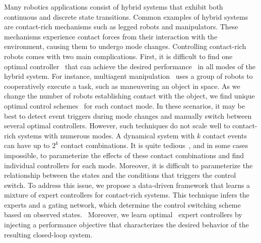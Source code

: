 

Many robotics applications consist of hybrid systems that exhibit both
continuous and discrete state transitions. Common examples of hybrid systems are
contact-rich mechanisms such as legged robots and manipulators. These mechanisms
experience contact forces from their interaction with the environment, causing
them to undergo mode changes. Controlling contact-rich robots comes with two
main complications. First, it is difficult to find one optimal
controller~ that
can achieve the desired performance~ in all modes of the hybrid system.
%
For instance, multiagent manipulation~\cite{ashenafi2021nonholonomic} uses a
group of robots to cooperatively execute a task, such as maneuvering an object in
space.
%
As we change the number of robots establishing contact with the object, we find
unique optimal control schemes~ for each contact mode.
%
In these scenarios, it may be best to detect event triggers during mode changes and
manually switch between several optimal controllers.
%
However, such techniques do not scale well to contact-rich systems with numerous
modes. A dynamical system with $k$ contact events~ can have up to $2^k$ contact
combinations. It is quite tedious~, and in some cases impossible, to parameterize
the effects of these contact combinations and find individual controllers for
each mode. Moreover, it is difficult to parameterize the relationship between
the states and the conditions that triggers the control switch. 
%
To address this issue, we propose a data-driven framework that
learns a mixture of expert controllers for contact-rich systems.
%
This technique infers the experts and a gating network, which determine the
control switching scheme based on observed states.~
%
Moreover, we learn optimal~ expert controllers by injecting a performance
objective that characterizes the desired behavior of the resulting closed-loop
system.


